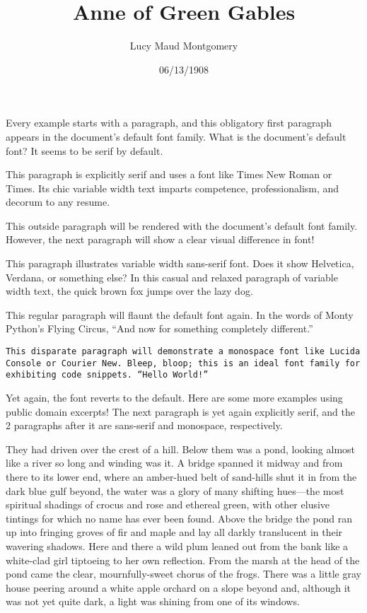 \documentclass[a4paper]{article}
\title{Anne of Green Gables}
\author{Lucy Maud Montgomery}
\date{06/13/1908}
\begin{document}
\maketitle

Every example starts with a paragraph, and this obligatory first paragraph appears in the document's default font family. What is the document's default font? It seems to be serif by default.

\textrm{This paragraph is explicitly serif and uses a font like Times New Roman or Times. Its chic variable width text imparts competence, professionalism, and decorum to any resume.}

This outside paragraph will be rendered with the document's default font family. However, the next paragraph will show a clear visual difference in font!

\textsf{This paragraph illustrates variable width sans-serif font. Does it show Helvetica, Verdana, or something else? In this casual and relaxed paragraph of variable width text, the quick brown fox jumps over the lazy dog.}

This regular paragraph will flaunt the default font again. In the words of Monty Python's Flying Circus, ``And now for something completely different.''

\texttt{This disparate paragraph will demonstrate a monospace font like Lucida Console or Courier New. Bleep, bloop; this is an ideal font family for exhibiting code snippets. ``Hello World!''}

Yet again, the font reverts to the default. Here are some more examples using public domain excerpts! The next paragraph is yet again explicitly serif, and the 2 paragraphs after it are sans-serif and monospace, respectively.

\textrm{They had driven over the crest of a hill. Below them was a pond, looking almost like a river so long and winding was it. A bridge spanned it midway and from there to its lower end, where an amber-hued belt of sand-hills shut it in from the dark blue gulf beyond, the water was a glory of many shifting hues---the most spiritual shadings of crocus and rose and ethereal green, with other elusive tintings for which no name has ever been found. Above the bridge the pond ran up into fringing groves of fir and maple and lay all darkly translucent in their wavering shadows. Here and there a wild plum leaned out from the bank like a white-clad girl tiptoeing to her own reflection. From the marsh at the head of the pond came the clear, mournfully-sweet chorus of the frogs. There was a little gray house peering around a white apple orchard on a slope beyond and, although it was not yet quite dark, a light was shining from one of its windows.}
\end{document}
